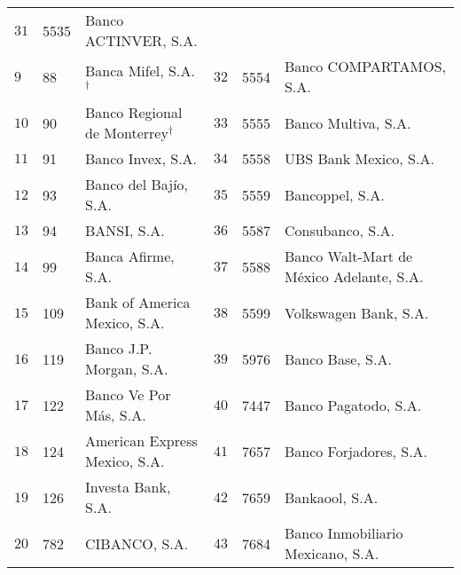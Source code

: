 \documentclass[preprint,floatfix] {revtex4}
\begin{document}
\begin{table}[h]
\begin{ruledtabular}
\begin{tabular}{llllll}
                            $31$ &  5535  &   Banco ACTINVER, S.A.
                            \\
                            $9$ &   88  &   Banca Mifel, S.A.$^\dag$    &
                            $32$ &  5554  &   Banco COMPARTAMOS, S.A.
                            \\
                            $10$ &   90  &   Banco Regional de Monterrey$^\dag$    &
                            $33$ &  5555  &   Banco Multiva, S.A.
                            \\
                            $11$ &  91  &   Banco Invex, S.A. &
                            $34$ &  5558  &   UBS Bank Mexico, S.A.                                
                            \\
                            $12$ &  93  &   Banco del Bajío, S.A. &
                            $35$ &  5559  &  Bancoppel, S.A. 
                            \\
                            $13$ &  94  &   BANSI, S.A. &
                            $36$ &  5587  &   Consubanco, S.A. 
                            \\
                            $14$ &  99  &   Banca Afirme, S.A. &
                            $37$ &  5588  &   Banco Walt-Mart de México Adelante, S.A. 
                            \\
                            $15$ &  109  &   Bank of America Mexico, S.A. &
                            $38$ &  5599  &   Volkswagen Bank, S.A. 
                            \\
                            $16$ &  119  &   Banco J.P. Morgan, S.A. &
                            $39$ &  5976  &   Banco Base, S.A. 
                            \\
                            $17$ &  122  &   Banco Ve Por Más, S.A. &
                            $40$ &  7447  &   Banco Pagatodo, S.A. 
                            \\
                            $18$ &  124  &   American Express Mexico, S.A. &
                            $41$ &  7657  &   Banco Forjadores, S.A. 
                            \\
                            $19$ &  126  &   Investa Bank, S.A. &
                            $42$ &  7659  &   Bankaool, S.A. 
                            \\
                            $20$ &  782  &   CIBANCO, S.A. &
                            $43$ &  7684  &   Banco Inmobiliario Mexicano, S.A. 

\end{tabular}
\end{ruledtabular}
\end{table}
\end{document}
